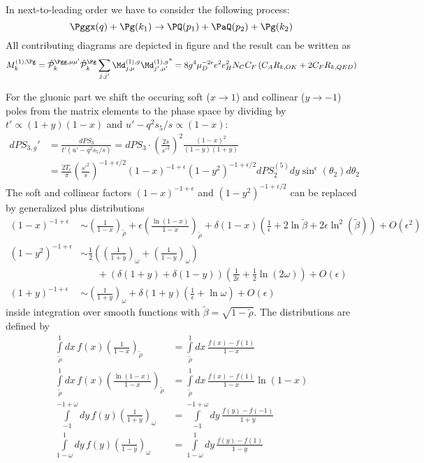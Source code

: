 \label{sec:NLO.g}
In next-to-leading order we have to consider the following process:
\begin{equation}
\Pggx(q) + \Pg(k_1) \rightarrow \PQ(p_1)+\PaQ(p_2) + \Pg(k_2)
\end{equation}
All contributing diagrams are depicted in figure  and the result can be written as
\begin{equation}
M_k^{(1),\Pg} = \hat {\mathcal P}_{k}^{\Pgg,\mu\mu'}\hat {\mathcal P}_{k}^{\Pg}\sum_{j,j'}{\Md^{(1),g}_{j,\mu}\Md^{(1),g}_{j',\mu'}}^* = 8g^4\mu_D^{-2\epsilon}e^2e_H^2 N_C C_F\left( C_A R_{k,OK} + 2C_F R_{k,QED}\right)
\end{equation}

For the gluonic part we shift the occuring soft ($x\rightarrow 1$) and collinear ($y\rightarrow -1$) poles from the matrix elements to the phase space by dividing by $t'\propto(1+y)(1-x)$ and $u'-q^2s_5/s\propto(1-x)$:
\begin{align}
dPS_{3,g}' &= \frac{dPS_3}{t'(u'-q^2s_5/s)} = dPS_3 \cdot \left(\frac {2s}{{s'}^2}\right)^2\frac{(1-x)^2}{(1-y)(1+y)}\\
 &= \frac {2T_\epsilon}{\pi} \left(\frac {{s'}^2} s\right)^{-1+\epsilon/2} (1-x)^{-1+\epsilon}(1-y^2)^{-1+\epsilon/2}dPS_2^{(5)}dy \sin^\epsilon(\theta_2)d\theta_2
\end{align}
The soft and collinear factors $(1-x)^{-1+\epsilon}$ and $(1-y^2)^{-1+\epsilon/2}$ can be replaced by generalized plus distributions\cite{Harris:1995tu}
\begin{align}
(1-x)^{-1+\epsilon} &\sim \left(\frac 1 {1-x}\right)_{\tilde\rho} + \epsilon \left(\frac{\ln(1-x)}{1-x}\right)_{\tilde \rho} + \delta(1-x)\left(\frac 1 \epsilon + 2\ln\tilde\beta + 2\epsilon\ln^2(\tilde\beta)\right) + O(\epsilon^2)\\
(1-y^2)^{-1+\epsilon} &\sim \frac 1 2\left(\left(\frac 1 {1+y}\right)_\omega + \left(\frac 1 {1-y}\right)_\omega\right) \nonumber\\
 &\hspace{20pt} + \left(\delta(1+y)+\delta(1-y)\right)\left(\frac 1 {2\epsilon} + \frac 1 2\ln(2\omega)\right) + O(\epsilon)\\
(1+y)^{-1+\epsilon} &\sim \left(\frac 1 {1+y}\right)_\omega + \delta(1+y)\left(\frac 1 \epsilon + \ln\omega\right) + O(\epsilon)
\end{align}
inside integration over smooth functions with $\tilde \beta = \sqrt{1-\tilde\rho}$. The distributions are defined by
\begin{align}
\int\limits_{\tilde\rho}^1\!\!dx\,f(x)\left(\frac 1 {1-x}\right)_{\tilde\rho} &= \int\limits_{\tilde\rho}^1\!\!dx\,\frac {f(x) - f(1)} {1-x}\\
\int\limits_{\tilde\rho}^1\!\!dx\,f(x)\left(\frac {\ln(1-x)} {1-x}\right)_{\tilde\rho} &= \int\limits_{\tilde\rho}^1\!\!dx\,\frac {f(x) - f(1)} {1-x}\ln(1-x)\\
\int\limits_{-1}^{-1+\omega}\!\!\!dy\,f(y)\left(\frac 1 {1+y}\right)_{\omega} &= \int\limits_{-1}^{-1+\omega}\!\!\!dy\,\frac {f(y)-f(-1)} {1+y}\\
\int\limits_{1-\omega}^{1}\!\!dy\,f(y)\left(\frac 1 {1-y}\right)_{\omega} &= \int\limits_{1-\omega}^{1}\!\!dy\,\frac {f(y)-f(1)} {1-y}
\end{align}
